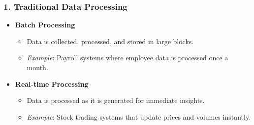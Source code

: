 \documentclass[aspectratio=169]{beamer}
\begin{document}
\begin{frame}[fragile]
    \frametitle{1. Traditional Data Processing}
    \begin{itemize}
        \item \textbf{Batch Processing}
            \begin{itemize}
                \item Data is collected, processed, and stored in large blocks.
                \item \textit{Example}: Payroll systems where employee data is processed once a month.
            \end{itemize}
        
        \item \textbf{Real-time Processing}
            \begin{itemize}
                \item Data is processed as it is generated for immediate insights.
                \item \textit{Example}: Stock trading systems that update prices and volumes instantly.
            \end{itemize}
    \end{itemize}
\end{frame}
\end{document}
